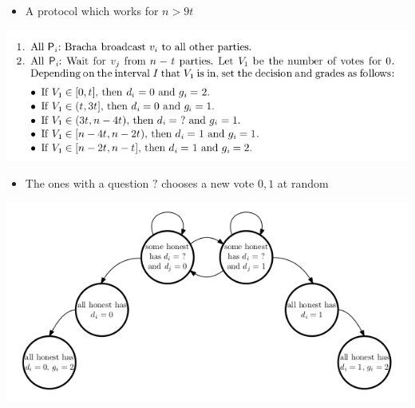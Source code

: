 \documentclass[11pt]{article}
\begin{document}
\begin{itemize}
\item A protocol which works for \(n > 9t\)
\end{itemize}
\begin{center}
\includegraphics[width=.9\linewidth]{Asynchronous Agreement (8)/screenshot_2018-10-04_10-40-32.png}
\end{center}
\begin{itemize}
\item The ones with a question \(?\) chooses a new vote \(0,1\) at random
\end{itemize}
\begin{center}
\includegraphics[width=.9\linewidth]{Asynchronous Agreement (8)/screenshot_2018-10-04_10-57-29.png}
\end{center}
\end{document}
